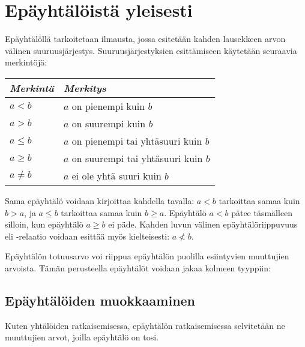 \section{Epäyhtälöistä yleisesti}
Epäyhtälöllä tarkoitetaan ilmausta, jossa esitetään kahden lausekkeen arvon välinen suuruusjärjestys. Suuruusjärjestyksien esittämiseen käytetään seuraavia merkintöjä:

\begin{center}
\begin{tabular}{l|l}
\emph{Merkintä} & \emph{Merkitys} \\
\hline
$a<b$ &  $a$ on pienempi kuin $b$ \\
$a>b$ & $a$ on suurempi kuin $b$ \\
$a \leq b$ & $a$ on pienempi tai yhtäsuuri kuin $b$ \\
$a \geq b$ & $a$ on suurempi tai yhtäsuuri kuin $b$ \\
$a \neq b$ & $a$ ei ole yhtä suuri kuin $b$ \\
\end{tabular}
\end{center}


Sama epäyhtälö voidaan kirjoittaa kahdella tavalla: $a < b$ tarkoittaa samaa kuin $b > a$, ja $a \leq b$ tarkoittaa samaa kuin $b \geq a$. Epäyhtälö $a < b$ pätee täsmälleen silloin, kun epäyhtälö $a \geq b$ ei päde. Kahden luvun välinen epäyhtälöriippuvuus eli -relaatio voidaan esittää myös kielteisesti: $a \nless b $.

Epäyhtälön totuusarvo voi riippua epäyhtälön puolilla esiintyvien muuttujien arvoista. Tämän perusteella epäyhtälöt voidaan jakaa kolmeen tyyppiin:




\subsection*{Epäyhtälöiden muokkaaminen}
Kuten yhtälöiden ratkaisemisessa, epäyhtälön ratkaisemisessa selvitetään ne muuttujien arvot, joilla epäyhtälö on tosi.

